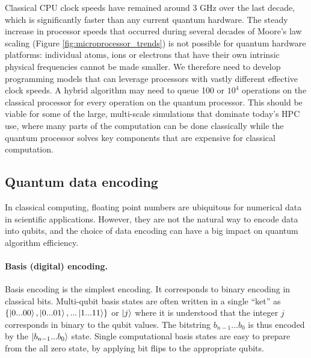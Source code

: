 \documentclass[10pt]{iopart}
\begin{document}
Classical CPU clock speeds have remained around 3 GHz over the last decade, which is significantly faster than any current quantum hardware. The steady increase in processor speeds that occurred during several decades of Moore's law scaling \cite{Moore1965} (Figure \ref{fig:microprocessor_trends}) is not possible for quantum hardware platforms: individual atoms, ions or electrons that have their own intrinsic physical frequencies cannot be made smaller.  We therefore need to develop programming models that can leverage processors with vastly different effective clock speeds.  A hybrid algorithm may need to queue 100 or $10^4$ operations on the classical processor for every operation on the quantum processor.  This should be viable for some of the large, multi-scale simulations that dominate today's HPC use, where many parts of the computation can be done classically while the quantum processor solves key components that are expensive for classical computation.


\subsection{Quantum data encoding} \label{ssec:encoding}

In classical computing, floating point numbers are ubiquitous for numerical data in scientific applications.  However, they are not the natural way to encode data into qubits, and the choice of data encoding can have a big impact on quantum algorithm efficiency.

\paragraph{Basis (digital) encoding.} Basis encoding is the simplest encoding. It corresponds to binary encoding in classical bits.  Multi-qubit basis states are often written in a single ``ket'' as
$\{ \ket{0...00}, \ket{0...01}, ... \ket{1...11} \}$ or $\ket{j}$ where it is understood that the integer $j$ corresponds in binary to the qubit values. The bitstring $b_{n-1} ... b_0$ is thus encoded by the $\ket{ b_{n-1} ... b_0}$ state.  Single computational basis states are easy to prepare from the all zero state, by applying bit flips to the appropriate qubits.
\end{document}
